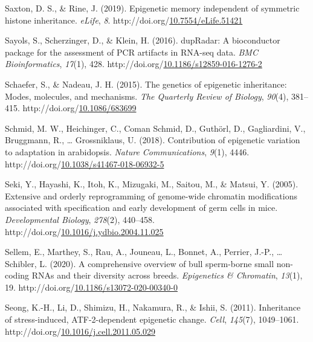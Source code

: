 \documentclass[12pt,twoside]{reedthesis}
\newlength{\cslhangindent}
\newenvironment{CSLReferences}[2] %
 {%
  \setlength{\parindent}{0pt}
  \ifodd #1 \everypar{\setlength{\hangindent}{\cslhangindent}}\ignorespaces\fi
  \ifnum #2 > 0
  \setlength{\parskip}{#2\baselineskip}
  \fi
 }%
 {}
\begin{document}
\begin{CSLReferences}{1}{0}
\leavevmode{}%
Saxton, D. S., \& Rine, J. (2019). Epigenetic memory independent of symmetric histone inheritance. \emph{eLife}, \emph{8}. http://doi.org/\href{https://doi.org/10.7554/eLife.51421}{10.7554/eLife.51421}

\leavevmode{}%
Sayols, S., Scherzinger, D., \& Klein, H. (2016). dupRadar: A bioconductor package for the assessment of PCR artifacts in RNA-seq data. \emph{BMC Bioinformatics}, \emph{17}(1), 428. http://doi.org/\href{https://doi.org/10.1186/s12859-016-1276-2}{10.1186/s12859-016-1276-2}

\leavevmode{}%
Schaefer, S., \& Nadeau, J. H. (2015). The genetics of epigenetic inheritance: Modes, molecules, and mechanisms. \emph{The Quarterly Review of Biology}, \emph{90}(4), 381--415. http://doi.org/\href{https://doi.org/10.1086/683699}{10.1086/683699}

\leavevmode{}%
Schmid, M. W., Heichinger, C., Coman Schmid, D., Guthörl, D., Gagliardini, V., Bruggmann, R., \ldots{} Grossniklaus, U. (2018). Contribution of epigenetic variation to adaptation in arabidopsis. \emph{Nature Communications}, \emph{9}(1), 4446. http://doi.org/\href{https://doi.org/10.1038/s41467-018-06932-5}{10.1038/s41467-018-06932-5}

\leavevmode{}%
Seki, Y., Hayashi, K., Itoh, K., Mizugaki, M., Saitou, M., \& Matsui, Y. (2005). Extensive and orderly reprogramming of genome-wide chromatin modifications associated with specification and early development of germ cells in mice. \emph{Developmental Biology}, \emph{278}(2), 440--458. http://doi.org/\href{https://doi.org/10.1016/j.ydbio.2004.11.025}{10.1016/j.ydbio.2004.11.025}

\leavevmode{}%
Sellem, E., Marthey, S., Rau, A., Jouneau, L., Bonnet, A., Perrier, J.-P., \ldots{} Schibler, L. (2020). A comprehensive overview of bull sperm-borne small non-coding {RNAs} and their diversity across breeds. \emph{Epigenetics \& Chromatin}, \emph{13}(1), 19. http://doi.org/\href{https://doi.org/10.1186/s13072-020-00340-0}{10.1186/s13072-020-00340-0}

\leavevmode{}%
Seong, K.-H., Li, D., Shimizu, H., Nakamura, R., \& Ishii, S. (2011). Inheritance of stress-induced, ATF-2-dependent epigenetic change. \emph{Cell}, \emph{145}(7), 1049--1061. http://doi.org/\href{https://doi.org/10.1016/j.cell.2011.05.029}{10.1016/j.cell.2011.05.029}


\end{CSLReferences}
\end{document}
